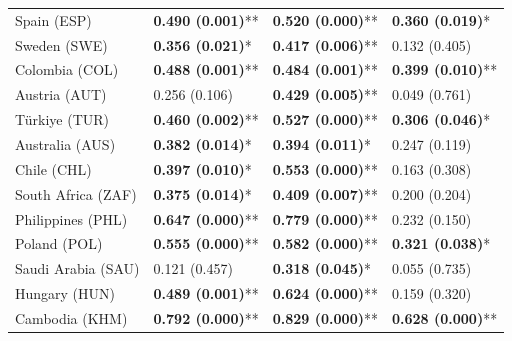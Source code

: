 \begin{longtable}{p{5cm}p{3cm}p{3cm}p{5cm}}
Spain (ESP) & \textcolor{atlLime600}{\textbf{0.490 (0.001)}**} & \textcolor{atlLime600}{\textbf{0.520 (0.000)}**} & \textcolor{atlLime600}{\textbf{0.360 (0.019)}*} \\
Sweden (SWE) & \textcolor{atlLime600}{\textbf{0.356 (0.021)}*} & \textcolor{atlLime600}{\textbf{0.417 (0.006)}**} & \textcolor{atlOrange600}{0.132 (0.405)} \\
Colombia (COL) & \textcolor{atlLime600}{\textbf{0.488 (0.001)}**} & \textcolor{atlLime600}{\textbf{0.484 (0.001)}**} & \textcolor{atlLime600}{\textbf{0.399 (0.010)}**} \\
Austria (AUT) & \textcolor{atlOrange600}{0.256 (0.106)} & \textcolor{atlLime600}{\textbf{0.429 (0.005)}**} & \textcolor{atlOrange600}{0.049 (0.761)} \\
Türkiye (TUR) & \textcolor{atlLime600}{\textbf{0.460 (0.002)}**} & \textcolor{atlLime600}{\textbf{0.527 (0.000)}**} & \textcolor{atlLime600}{\textbf{0.306 (0.046)}*} \\
Australia (AUS) & \textcolor{atlLime600}{\textbf{0.382 (0.014)}*} & \textcolor{atlLime600}{\textbf{0.394 (0.011)}*} & \textcolor{atlOrange600}{0.247 (0.119)} \\
Chile (CHL) & \textcolor{atlLime600}{\textbf{0.397 (0.010)}*} & \textcolor{atlLime600}{\textbf{0.553 (0.000)}**} & \textcolor{atlOrange600}{0.163 (0.308)} \\
South Africa (ZAF) & \textcolor{atlLime600}{\textbf{0.375 (0.014)}*} & \textcolor{atlLime600}{\textbf{0.409 (0.007)}**} & \textcolor{atlOrange600}{0.200 (0.204)} \\
Philippines (PHL) & \textcolor{atlLime600}{\textbf{0.647 (0.000)}**} & \textcolor{atlLime600}{\textbf{0.779 (0.000)}**} & \textcolor{atlOrange600}{0.232 (0.150)} \\
Poland (POL) & \textcolor{atlLime600}{\textbf{0.555 (0.000)}**} & \textcolor{atlLime600}{\textbf{0.582 (0.000)}**} & \textcolor{atlLime600}{\textbf{0.321 (0.038)}*} \\
Saudi Arabia (SAU) & \textcolor{atlOrange600}{0.121 (0.457)} & \textcolor{atlLime600}{\textbf{0.318 (0.045)}*} & \textcolor{atlOrange600}{0.055 (0.735)} \\
Hungary (HUN) & \textcolor{atlLime600}{\textbf{0.489 (0.001)}**} & \textcolor{atlLime600}{\textbf{0.624 (0.000)}**} & \textcolor{atlOrange600}{0.159 (0.320)} \\
Cambodia (KHM) & \textcolor{atlLime600}{\textbf{0.792 (0.000)}**} & \textcolor{atlLime600}{\textbf{0.829 (0.000)}**} & \textcolor{atlLime600}{\textbf{0.628 (0.000)}**} \\

\end{longtable}
